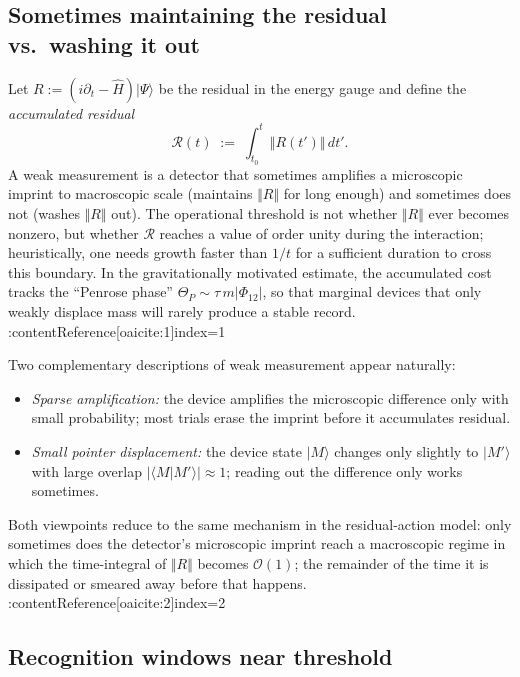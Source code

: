 \documentclass[11pt,letterpaper]{article}
\begin{document}
\subsection{Sometimes maintaining the residual vs.\ washing it out}

Let $R:=(i\partial_t-\hat H)|\Psi\rangle$ be the residual in the energy gauge and define the \emph{accumulated residual}
\begin{equation}
\mathcal R(t)\;:=\;\int_{t_0}^{t}\!\Vert R(t')\Vert\,dt'.
\end{equation}
A weak measurement is a detector that sometimes amplifies a microscopic imprint to macroscopic scale (maintains $\Vert R\Vert$ for long enough) and sometimes does not (washes $\Vert R\Vert$ out). The operational threshold is not whether $\Vert R\Vert$ ever becomes nonzero, but whether $\mathcal R$ reaches a value of order unity during the interaction; heuristically, one needs growth faster than $1/t$ for a sufficient duration to cross this boundary. In the gravitationally motivated estimate, the accumulated cost tracks the ``Penrose phase'' $\Theta_P\sim \tau\,m\vert\Phi_{12}\vert$, so that marginal devices that only weakly displace mass will rarely produce a stable record. :contentReference[oaicite:1]{index=1}

Two complementary descriptions of weak measurement appear naturally:
\begin{itemize}
\item \emph{Sparse amplification:} the device amplifies the microscopic difference only with small probability; most trials erase the imprint before it accumulates residual.
\item \emph{Small pointer displacement:} the device state $\lvert M\rangle$ changes only slightly to $\lvert M'\rangle$ with large overlap $\vert\langle M\vert M'\rangle\vert\approx 1$; reading out the difference only works sometimes.
\end{itemize}
Both viewpoints reduce to the same mechanism in the residual-action model: only sometimes does the detector's microscopic imprint reach a macroscopic regime in which the time-integral of $\Vert R\Vert$ becomes $\mathcal O(1)$; the remainder of the time it is dissipated or smeared away before that happens. :contentReference[oaicite:2]{index=2}

\subsection{Recognition windows near threshold}
\end{document}
